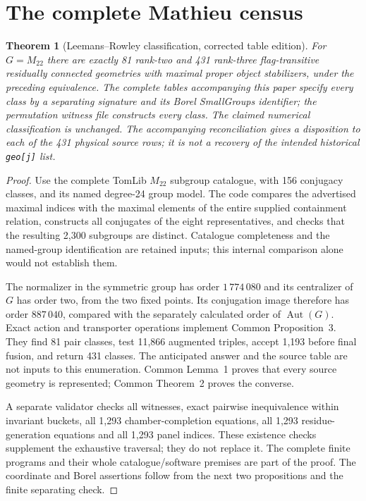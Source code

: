 \documentclass[11pt,a4paper]{article}
\newtheorem{theorem}{Theorem}\newtheorem{lemma}[theorem]{Lemma}\newtheorem{proposition}[theorem]{Proposition}
\newcommand{\Aut}{\operatorname{Aut}}\newcommand{\Stab}{\operatorname{Stab}}\newcommand{\cl}{\mathcal C}
\begin{document}
\section{The complete Mathieu census}
\begin{theorem}[Leemans--Rowley classification, corrected table edition]\label{thm:census}
For $G=M_{22}$ there are exactly 81 rank-two and 431 rank-three flag-transitive residually connected geometries with maximal proper object stabilizers, under the preceding equivalence. The complete tables accompanying this paper specify every class by a separating signature and its Borel SmallGroups identifier; the permutation witness file constructs every class. The claimed numerical classification is unchanged. The accompanying reconciliation gives a disposition to each of the 431 physical source rows; it is not a recovery of the intended historical \texttt{geo[j]} list.
\end{theorem}
\begin{proof}
Use the complete TomLib $M_{22}$ subgroup catalogue, with 156 conjugacy classes, and its named degree-24 group model. The code compares the advertised maximal indices with the maximal elements of the entire supplied containment relation, constructs all conjugates of the eight representatives, and checks that the resulting 2,300 subgroups are distinct. Catalogue completeness and the named-group identification are retained inputs; this internal comparison alone would not establish them.

The normalizer in the symmetric group has order $1\,774\,080$ and its centralizer of $G$ has order two, from the two fixed points. Its conjugation image therefore has order $887\,040$, compared with the separately calculated order of $\Aut(G)$. Exact action and transporter operations implement Common Proposition~3. They find 81 pair classes, test 11,866 augmented triples, accept 1,193 before final fusion, and return 431 classes. The anticipated answer and the source table are not inputs to this enumeration. Common Lemma~1 proves that every source geometry is represented; Common Theorem~2 proves the converse.

A separate validator checks all witnesses, exact pairwise inequivalence within invariant buckets, all 1,293 chamber-completion equations, all 1,293 residue-generation equations and all 1,293 panel indices. These existence checks supplement the exhaustive traversal; they do not replace it. The complete finite programs and their whole catalogue/software premises are part of the proof. The coordinate and Borel assertions follow from the next two propositions and the finite separating check.
\end{proof}
\end{document}
